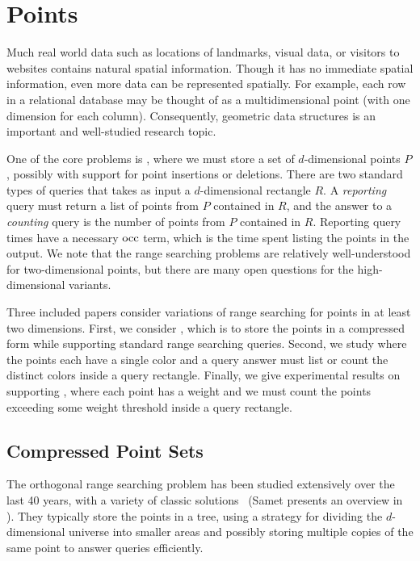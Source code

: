 \section{Points}
Much real world data such as locations of landmarks, visual data, or visitors to websites contains natural spatial information.
Though it has no immediate spatial information, even more data can be represented spatially. For example, each row in a relational database may be thought of as a multidimensional point (with one dimension for each column). Consequently, geometric data structures is an important and well-studied research topic. 

One of the core problems is , where we must store a set of $d$-dimensional points $P$, possibly with support for point insertions or deletions. There are two standard types of queries that takes as input a $d$-dimensional rectangle $R$. A \emph{reporting} query must return a list of points from $P$ contained in $R$, and the answer to a \emph{counting} query is the number of points from $P$ contained in $R$. Reporting query times have a necessary $\operatorname{occ}$ term, which is the time spent listing the points in the output.
We note that the range searching problems are relatively well-understood for two-dimensional points, but there are many open questions for the high-dimensional variants.

Three included papers consider variations of range searching for points in at least two dimensions. 
First, we consider , which is to store the points in a compressed form while supporting standard range searching queries.  
Second, we study  where the points each have a single color and a query answer must list or count the distinct colors inside a query rectangle.
Finally, we give experimental results on supporting , where each point has a weight and we must count the points exceeding some weight threshold inside a query rectangle.


\subsection{Compressed Point Sets}
The orthogonal range searching problem has been studied extensively over the last 40 years, with a variety of classic solutions~\cite{bentley1975multidimensional, bentley1979multidimensional, orenstein1982multidimensional, bentley1980decomposable, lueker1978data, lee1980quintary, guttman1984r, clarkson1983fast, kanth1999optimal, van1991dividedk, gaede1998multidimensional, bayer1972organization, arge2008priority, robinson1981kdb, procopiuc2003bkd, comer1979ubiquitous, eppstein2008skip} (Samet presents an overview in \cite{samet1990applications}). 
They typically store the points in a tree, using a strategy for dividing the $d$-dimensional universe into smaller areas and possibly storing multiple copies of the same point to answer queries efficiently. 

